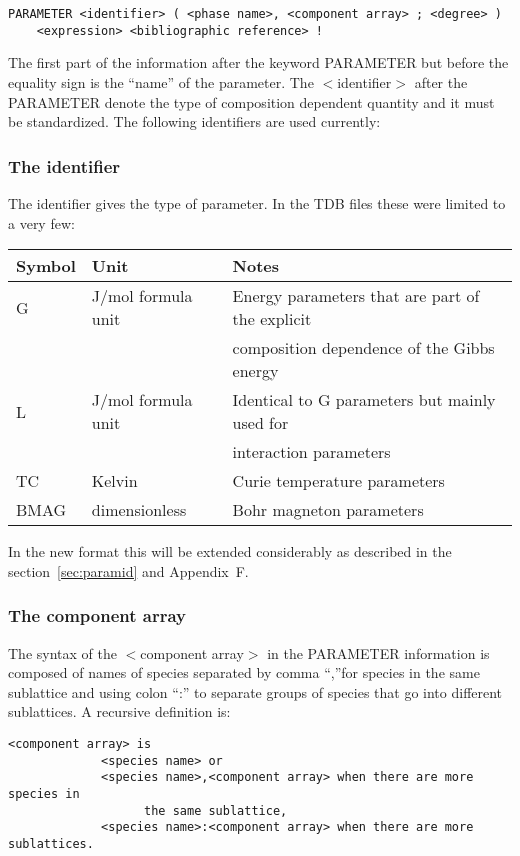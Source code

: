 \documentclass[12pt]{article}
\begin{document}
\begin{verbatim}
PARAMETER <identifier> ( <phase name>, <component array> ; <degree> )
    <expression> <bibliographic reference> !
\end{verbatim}

The first part of the information after the keyword PARAMETER but
before the equality sign is the ``name'' of the parameter.  The
$<$identifier$>$ after the PARAMETER denote the type of composition
dependent quantity and it must be standardized.  The following
identifiers are used currently:

\subsubsection{The identifier}\label{sec:tdbid}

The identifier gives the type of parameter.  In the TDB files these
were limited to a very few:

\begin{tabular}{lll}
Symbol & Unit &      Notes\\\hline
G      & J/mol formula unit & Energy parameters that are part of the explicit\\
 && composition dependence of the Gibbs energy\\
L     & J/mol formula unit & Identical to G parameters but mainly used for\\
 && interaction parameters\\
TC    & Kelvin & Curie temperature parameters\\
BMAG & dimensionless & Bohr magneton parameters\\\hline
\end{tabular}

\bigskip

In the new format this will be extended considerably as described
in the section~\ref{sec:paramid} and Appendix~F.

\subsubsection{The component array}\label{sec:comparr}

The syntax of the $<$component array$>$ in the PARAMETER information is
composed of names of species separated by comma ``,''for species in the
same sublattice and using colon ``:'' to separate groups of species that
go into different sublattices.  A recursive definition is:

\begin{verbatim}
<component array> is
             <species name> or
             <species name>,<component array> when there are more species in
                   the same sublattice,
             <species name>:<component array> when there are more sublattices.
\end{verbatim}
\end{document}
